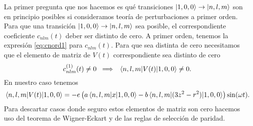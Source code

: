 \documentclass[10pt, a4paper]{article}
\numberwithin{equation}{subsection}
\begin{document}
\bigbreak

La primer pregunta que nos hacemos es qué transiciones $\ket{1,0,0} \to
\ket{n,l,m}$ son en principio posibles si consideramos teoría de perturbaciones
a primer orden. Para que una transición $\ket{1,0,0} \to \ket{n,l,m}$ sea
posible, el correspondiente coeficiente $c_{nlm}(t)$ deber ser distinto de
cero. A primer orden, tenemos la expresión \eqref{eq:cnord1} para
$c_{nlm}(t)$. Para que sea distinta de cero necesitamos que el elemento de
matriz de $V(t)$ correspondiente sea distinto de cero
\begin{equation}
  c^{(1)}_{nlm}(t) \neq 0 \;\implies\; \matrixel{n,l,m}{V(t)}{1,0,0} \neq 0.
\end{equation}
En nuestro caso tenemos
\begin{equation}
  \matrixel{n,l,m}{V(t)}{1,0,0} = -e\left(a\matrixel{n,l,m}{x}{1,0,0} -b
  \matrixel{n,l,m}{(3z^2 - r^2)}{1,0,0}\right)\sin(\omega t).
\end{equation}
Para descartar casos donde seguro estos elementos de matriz son cero hacemos
uso del teorema de Wigner-Eckart y de las reglas de selección de paridad.

\bigbreak
\end{document}
